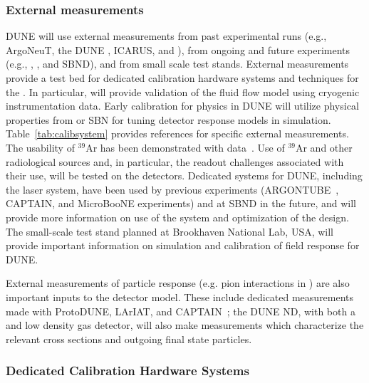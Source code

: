 \subsubsection{External measurements} 

DUNE will use external measurements from past experimental runs (e.g., ArgoNeuT, the DUNE , ICARUS, and \lariat), from ongoing and future experiments (e.g., , , and SBND), and from small scale  test stands. External measurements provide a test bed for dedicated calibration hardware systems and techniques for the . In particular,  will provide validation of the fluid flow model using cryogenic instrumentation data. 
Early calibration for physics in DUNE will utilize \lar physical properties from  or SBN  for tuning detector response models in simulation. Table~\ref{tab:calibsystem} provides  references for specific external measurements. The usability of ${}^{39}$Ar has been demonstrated with \microboone data~\cite{MICROBOONE-NOTE-1050-PUB}. 
Use of  ${}^{39}$Ar  and other radiological sources and, in particular, the  readout challenges associated with their use, will be tested on the  detectors. Dedicated systems for DUNE, 
including the laser system, have been used by previous experiments (ARGONTUBE~\cite{Zeller:2013sva,Ereditato:2014lra}, CAPTAIN, and MicroBooNE experiments) and at SBND in the future, and will provide more information on use of the system and optimization of the design.  The small-scale \lar test stand planned at Brookhaven National Lab, USA, will provide important information on simulation and calibration of field response for DUNE.

External measurements of particle response (e.g. pion interactions in ) are also important inputs to the detector model. These include dedicated measurements made with ProtoDUNE, LArIAT, and CAPTAIN~\cite{Bhandari:2019rat}; the DUNE ND, with both a  and low density gas detector, will also make measurements which characterize the relevant cross sections and outgoing final state particles.


\subsubsection{Dedicated Calibration Hardware Systems}
\label{sec:phys-calib-hardware}

